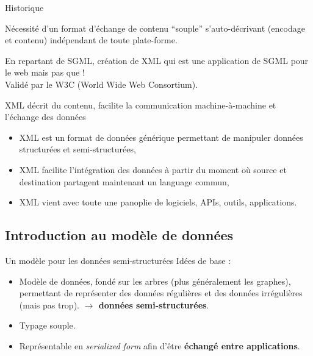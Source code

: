 \begin{frame}[allowframebreaks]{Historique}
\begin{block}{}
N\'ecessit\'e d'un format d'\'echange de contenu ``souple'' s'auto-d\'ecrivant (encodage et contenu) ind\'ependant de toute plate-forme.
\end{block}


\framebreak

En repartant de SGML, cr\'eation de XML qui est une application de SGML pour le web mais pas que !\\

Valid\'e par le W3C (World Wide Web Consortium).


\framebreak

XML d\'ecrit du contenu, facilite la communication machine-\`a-machine et l'\'echange des donn\'ees
\begin{itemize}
\item XML est un format de donn\'ees g\'en\'erique permettant de manipuler donn\'ees structur\'ees et semi-structur\'ees,
\item XML facilite l'int\'egration des donn\'ees \`a partir du moment o\`u source et destination partagent maintenant un language commun,
\item XML vient avec toute une panoplie de logiciels, APIs, outils, applications.
\end{itemize}

\end{frame}

\subsection{Introduction au mod\`ele de donn\'ees}

\begin{frame}{Un mod\`ele pour les donn\'ees semi-structur\'ees}
Id\'ees de base :

\begin{itemize}
\item Mod\`ele de donn\'ees, fond\'e sur les arbres (plus généralement les graphes), permettant de repr\'esenter des donn\'ees r\'eguli\`eres et des donn\'ees irr\'eguli\`eres (mais pas trop). \textbf{$\rightarrow$ donn\'ees semi-structur\'ees}.
\item Typage souple.
\item Repr\'esentable en \textit{serialized form} afin d'\^etre \textbf{\'echang\'e entre applications}.
\end{itemize}

\end{frame}



